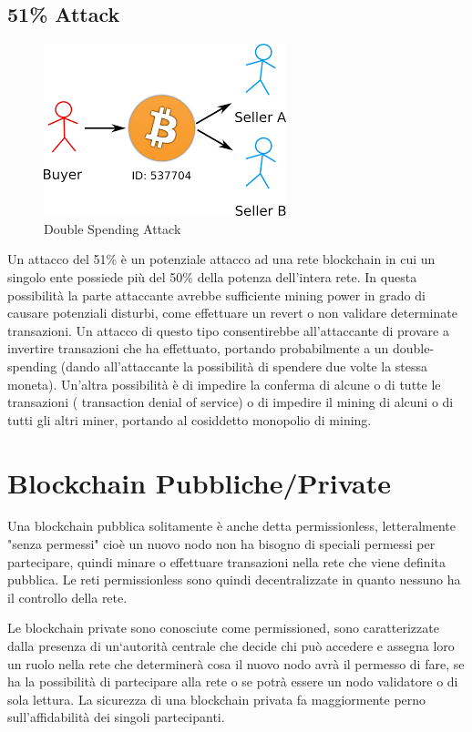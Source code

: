 \documentclass[11pt,a4paper,titlepage, twoside, openright]{report}
\begin{document}
\subsection{51\% Attack}
\begin{figure}[h]
	\includegraphics[height=0.2\textheight]{dsa}
	\centering
	\caption{Double Spending Attack}
	\label{fig:ds-attack}
\end{figure}
Un attacco del 51\% è un potenziale attacco ad una rete blockchain in cui un singolo ente possiede più del 50\% della potenza dell'intera rete. In questa possibilità la parte attaccante avrebbe sufficiente mining power in grado di causare potenziali disturbi, come effettuare un revert o non validare determinate transazioni. Un attacco di questo tipo consentirebbe all’attaccante di provare a invertire transazioni che ha effettuato, portando probabilmente a un double-spending (dando all'attaccante la possibilità di spendere due volte la stessa moneta). Un'altra possibilità è di impedire la conferma di alcune o di tutte le transazioni ( transaction denial of service) o di impedire il mining di alcuni o di tutti gli altri miner, portando al cosiddetto monopolio di mining.

\section{Blockchain Pubbliche/Private}
Una blockchain pubblica solitamente è anche detta permissionless, letteralmente "senza permessi" cioè un nuovo nodo non ha bisogno di speciali permessi per partecipare, quindi minare o effettuare transazioni nella rete che viene definita pubblica. Le reti permissionless sono quindi decentralizzate in quanto nessuno ha il controllo della rete.

Le blockchain private sono conosciute come permissioned, sono caratterizzate dalla presenza di un`autorità centrale che decide chi può accedere e assegna loro un ruolo nella rete che determinerà cosa il nuovo nodo avrà il permesso di fare, se ha la possibilità di partecipare alla rete o se potrà essere un nodo validatore o di sola lettura. La sicurezza di una blockchain privata fa maggiormente perno sull'affidabilità dei singoli partecipanti.
\end{document}
